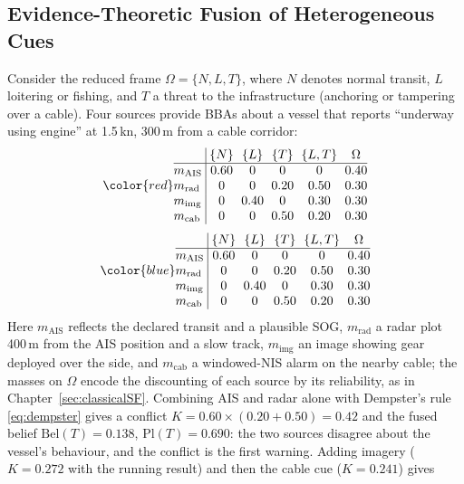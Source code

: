 \documentclass[graybox,envcountchap]{style/SNmono}
\providecommand{\DIFadd}[1]{{\protect\color{blue} #1}} %
\providecommand{\DIFdel}[1]{{\protect\color{red} #1}} %
\providecommand{\DIFaddbegin}{} %
\providecommand{\DIFaddend}{} %
\providecommand{\DIFdelbegin}{} %
\providecommand{\DIFdelend}{} %
\begin{document}
\subsection{Evidence-Theoretic Fusion of Heterogeneous Cues}
\label{subsec:maritime-evidence}
\begin{example}
\label{ex:ch07-maritime-evidence}
Consider the reduced frame $\Omega=\{N,L,T\}$, where $N$ denotes normal transit, $L$ loitering or fishing, and $T$ a threat to the infrastructure (anchoring or tampering over a cable). Four sources provide BBAs about a vessel that reports ``underway using engine'' at 1.5\,kn, 300\,m from a cable corridor:
\DIFdelbegin \begin{displaymath}
\DIFdel{\setlength{\arraycolsep}{3pt}
\begin{array}{@{}l|ccccc@{}}
 & \{N\} & \{L\} & \{T\} & \{L,T\} & \Omega \\
\hline
m_{\mathrm{AIS}} & 0.60 & 0 & 0 & 0 & 0.40 \\
m_{\mathrm{rad}} & 0 & 0 & 0.20 & 0.50 & 0.30 \\
m_{\mathrm{img}} & 0 & 0.40 & 0 & 0.30 & 0.30 \\
m_{\mathrm{cab}} & 0 & 0 & 0.50 & 0.20 & 0.30
\end{array}
}\end{displaymath}%
\DIFdelend \DIFaddbegin \begin{equation}
\DIFadd{\setlength{\arraycolsep}{3pt}
\begin{array}{@{}l|ccccc@{}}
 & \{N\} & \{L\} & \{T\} & \{L,T\} & \Omega \\
\hline
m_{\mathrm{AIS}} & 0.60 & 0 & 0 & 0 & 0.40 \\
m_{\mathrm{rad}} & 0 & 0 & 0.20 & 0.50 & 0.30 \\
m_{\mathrm{img}} & 0 & 0.40 & 0 & 0.30 & 0.30 \\
m_{\mathrm{cab}} & 0 & 0 & 0.50 & 0.20 & 0.30
\end{array}
\label{eq:ch07-maritime-bbas}
}\end{equation}\DIFaddend 
Here $m_{\mathrm{AIS}}$ reflects the declared transit and a plausible SOG, $m_{\mathrm{rad}}$ a radar plot 400\,m from the AIS position and a slow track, $m_{\mathrm{img}}$ an image showing gear deployed over the side, and $m_{\mathrm{cab}}$ a windowed-NIS alarm on the nearby cable; the masses on $\Omega$ encode the discounting of each source by its reliability, as in Chapter~\ref{sec:classicalSF}. Combining AIS and radar alone with Dempster's rule \eqref{eq:dempster} gives a conflict $K=0.60\times(0.20+0.50)=0.42$ and the fused belief $\mathrm{Bel}(T)=0.138$, $\mathrm{Pl}(T)=0.690$: the two sources disagree about the vessel's behaviour, and the conflict is the first warning. Adding imagery ($K=0.272$ with the running result) and then the cable cue ($K=0.241$) gives

\end{example}
\end{document}
